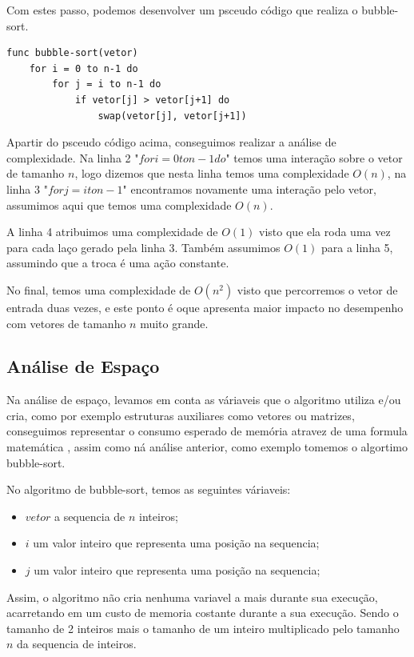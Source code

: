 \documentclass[
	12pt,				%
	openright,			%
	oneside,			%
	a4paper,			%
	english,			%
	brazil				%
	]{abntex2}
\begin{document}
Com estes passo, podemos desenvolver um psceudo código que realiza o bubble-sort.

\lstset{style=psceudo}
\begin{lstlisting}
func bubble-sort(vetor)
	for i = 0 to n-1 do
		for j = i to n-1 do
			if vetor[j] > vetor[j+1] do
				swap(vetor[j], vetor[j+1])
\end{lstlisting}

Apartir do psceudo código acima, conseguimos realizar a análise de complexidade. Na linha 2 "$for i = 0 to n-1 do$"
temos uma interação sobre o vetor de tamanho $n$, logo dizemos que nesta linha temos uma complexidade $O(n)$, na
linha 3 "$for j = i to n-1$" encontramos novamente uma interação pelo vetor, assumimos aqui que temos uma
complexidade $O(n)$.

A linha 4 atribuimos uma complexidade de $O(1)$ visto que ela roda uma vez para cada laço gerado pela linha 3. Também
assumimos $O(1)$ para a linha 5, assumindo que a troca é uma ação constante.

No final, temos uma complexidade de $O(n^2)$ visto que percorremos o vetor de entrada duas vezes, e este ponto
é oque apresenta maior impacto no desempenho com vetores de tamanho $n$ muito grande.

\subsection{Análise de Espaço}

Na análise de espaço, levamos em conta as váriaveis que o algoritmo utiliza e/ou cria, como por exemplo estruturas
auxiliares como vetores ou matrizes, conseguimos representar o consumo esperado de memória atravez de uma formula
matemática \cite{introductionAnalysis}, assim como ná análise anterior, como exemplo tomemos o algortimo bubble-sort.

No algoritmo de bubble-sort, temos as seguintes váriaveis:

\begin{itemize}
	\item $vetor$ a sequencia de $n$ inteiros;
	\item $i$ um valor inteiro que representa uma posição na sequencia;
	\item $j$ um valor inteiro que representa uma posição na sequencia;
\end{itemize}

Assim, o algoritmo não cria nenhuma variavel a mais durante sua execução, acarretando em um custo de memoria costante durante
a sua execução. Sendo o tamanho de 2 inteiros mais o tamanho de um inteiro multiplicado pelo tamanho $n$ da sequencia de
inteiros.
\end{document}

